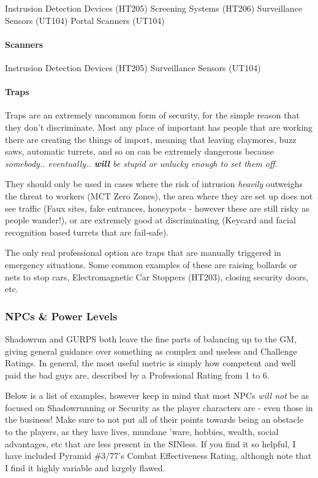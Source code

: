 \begin{multicols*}{2}
	Instrusion Detection Devices (HT205)
	Screening Systems (HT206)
	Surveillance Sensors (UT104)
	Portal Scanners (UT104)
	
	\paragraph{Scanners}
	
	Instrusion Detection Devices (HT205)
	Surveillance Sensors (UT104)
	
	
	\paragraph{Traps}
	
	Traps are an extremely uncommon form of security, for the simple reason that they don't discriminate. Most any place of important has people that are working there are creating the things of import, meaning that leaving claymores, buzz saws, automatic turrets, and so on can be extremely dangerous because \textit{somebody.. eventually.. \textbf{will} be stupid or unlucky enough to set them off}.
	
	They should only be used in cases where the risk of intrusion \textit{heavily} outweighs the threat to workers (MCT Zero Zones), the area where they are set up does not see traffic (Faux sites, fake entrances, honeypots - however these are still risky as people wander!), or are extremely good at discriminating (Keycard and facial recognition based turrets that are fail-safe).
	
	The only real professional option are traps that are manually triggered in emergency situations. Some common examples of these are raising bollards or nets to stop cars, Electromagnetic Car Stoppers (HT203), closing security doors, etc.
	
	\subsubsection{NPCs \& Power Levels}
	
	Shadowrun and GURPS both leave the fine parts of balancing up to the GM, giving general guidance over something as complex and useless and Challenge Ratings. In general, the most useful metric is simply how competent and well paid the bad guys are, described by a Professional Rating from 1 to 6. 
	
	Below is a list of examples, however keep in mind that most NPCs \textit{will not} be as focused on Shadowrunning or Security as the player characters are - even those in the business! Make sure to not put all of their points towards being an obstacle to the players, as they have lives, mundane 'ware, hobbies, wealth, social advantages, etc that are less present in the SINless. If you find it so helpful, I have included Pyramid \#3/77's Combat Effectiveness Rating, although note that I find it highly variable and largely flawed.
	

\end{multicols*}
